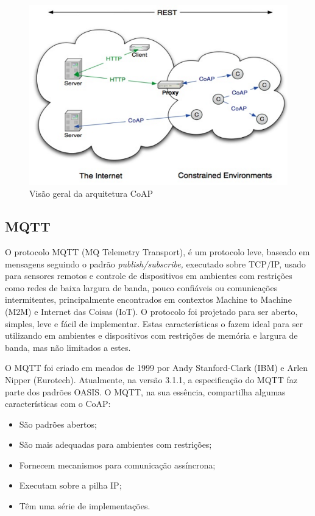 \begin{figure}[h]
\begin{centering}
\includegraphics[width=0.8\linewidth]{Imagens/Cap_2/coap}
\par\end{centering}
\caption{Visão geral da arquitetura CoAP \cite{img:Shelby2014}\label{fig:coap}}
\end{figure}
 

\subsection{MQTT}

O protocolo MQTT (MQ Telemetry Transport)\cite{mqtt:spec}, é um protocolo
leve, baseado em mensagens seguindo o padrão \emph{publish/subscribe,}
executado sobre TCP/IP, usado para sensores remotos e controle de
dispositivos em ambientes com restrições como redes de baixa largura
de banda, pouco confiáveis ou comunicações intermitentes, principalmente
encontrados em contextos Machine to Machine (M2M) e Internet das Coisas
(IoT). O protocolo foi projetado para ser aberto, simples, leve e
fácil de implementar. Estas características o fazem ideal para ser
utilizando em ambientes e dispositivos com restrições de memória e
largura de banda, mas não limitados a estes.

O MQTT foi criado em meados de 1999 por Andy Stanford-Clark (IBM)
e Arlen Nipper (Eurotech). Atualmente, na versão 3.1.1, a especificação
do MQTT faz parte dos padrões OASIS\cite{mqtt:oasis}. O MQTT, na
sua essência, compartilha algumas características com o CoAP:
\begin{itemize}
\item São padrões abertos; 
\item São mais adequadas para ambientes com restrições;
\item Fornecem mecanismos para comunicação assíncrona; 
\item Executam sobre a pilha IP;
\item Têm uma série de implementações.
\end{itemize}

